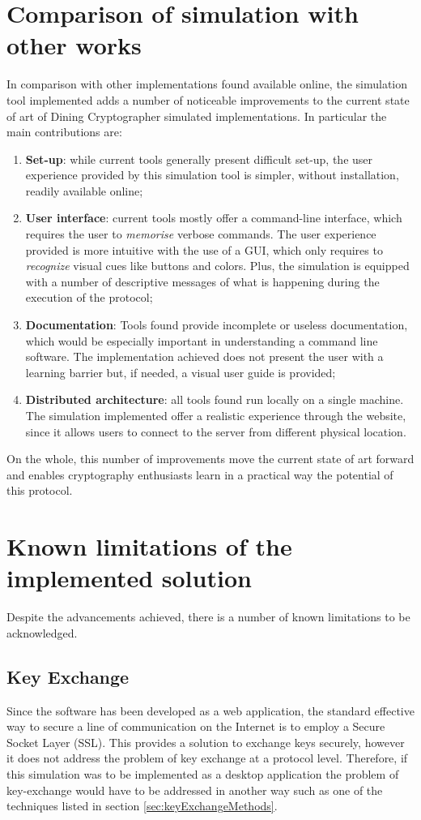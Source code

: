 \section{Comparison of simulation with other works}
In comparison with other implementations found available online, the simulation tool implemented adds a number of noticeable improvements to the current state of art of Dining Cryptographer simulated implementations. In particular the main contributions are:
\begin{enumerate}
    \item \textbf{Set-up}: while current tools generally present difficult set-up, the user experience provided by this simulation tool is simpler, without installation, readily available online;
    \item \textbf{User interface}: current tools mostly offer a command-line interface, which requires the user to \textit{memorise} verbose commands. The user experience provided is more intuitive with the use of a GUI, which only requires to \textit{recognize} visual cues like buttons and colors. Plus, the simulation is equipped with a number of descriptive messages of what is happening during the execution of the protocol;
    \item \textbf{Documentation}: Tools found provide incomplete or useless documentation, which would be especially important in understanding a command line software. The implementation achieved does not present the user with a learning barrier but, if needed, a visual user guide is provided;
    \item \textbf{Distributed architecture}: all tools found run locally on a single machine. The simulation implemented offer a realistic experience through the website, since it allows users to connect to the server from different physical location.
\end{enumerate}

On the whole, this number of improvements move the current state of art forward and enables cryptography enthusiasts learn in a practical way the potential of this protocol.

\section{Known limitations of the implemented solution}
Despite the advancements achieved, there is a number of known limitations to be acknowledged. 

\subsection{Key Exchange}
Since the software has been developed as a web application, the standard effective way to secure a line of communication on the Internet is to employ a Secure Socket Layer (SSL). This provides a solution to exchange keys securely, however it does not address the problem of key exchange at a protocol level. Therefore, if this simulation was to be implemented as a desktop application the problem of key-exchange would have to be addressed in another way such as one of the techniques listed in section \ref{sec:keyExchangeMethods}.

